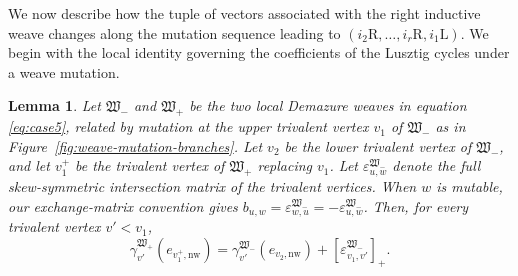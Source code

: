 \documentclass[12pt, reqno]{amsart}
\theoremstyle{plain}
\newtheorem{lemma}[theorem]{Lemma}
\theoremstyle{definition}
\numberwithin{equation}{section}
\begin{document}
We now describe how the tuple of vectors associated with the right
inductive weave changes along the mutation sequence leading to
\((i_2\mathrm R,\ldots,i_r\mathrm R,i_1\mathrm L)\). We begin with the local identity governing the coefficients of the
Lusztig cycles under a weave mutation.

\begin{lemma}\label{lem:gammamutation}
Let \(\mathfrak W_-\) and \(\mathfrak W_+\) be the two local
Demazure weaves in equation \eqref{eq:case5}, related
by mutation at the upper trivalent vertex \(v_1\) of
\(\mathfrak W_-\) as in Figure~\ref{fig:weave-mutation-branches}. Let \(v_2\) be the lower trivalent vertex of
\(\mathfrak W_-\), and let \(v_1^+\) be the trivalent vertex of
\(\mathfrak W_+\) replacing \(v_1\). Let
\(\varepsilon^{\mathfrak W_-}_{u,w}\) denote the full
skew-symmetric intersection matrix of the trivalent vertices. When
\(w\) is mutable, our exchange-matrix convention gives
\(b_{u,w}=\varepsilon^{\mathfrak W_-}_{w,u}
=-\varepsilon^{\mathfrak W_-}_{u,w}\).
Then, for every trivalent vertex \(v'<v_1\),
\begin{equation}\label{eq:gamma-local-mutation}
    \gamma_{v'}^{\mathfrak W_+}
        (e_{v_1^+,\mathrm{nw}})
    =
    \gamma_{v'}^{\mathfrak W_-}
        (e_{v_2,\mathrm{nw}})
    +[\varepsilon^{\mathfrak W_-}_{v_1,v'}]_+.
\end{equation}
\end{lemma}
\end{document}
